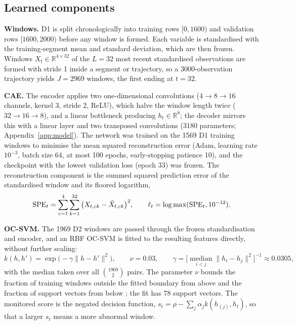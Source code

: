 \subsection{Learned components}

\textbf{Windows.} D1 is split chronologically into training rows $[0,1600)$ and validation rows
$[1600,2000)$ before any window is formed. Each variable is standardised with the training-segment
mean and standard deviation, which are then frozen. Windows $X_t\in\mathbb{R}^{4\times32}$ of the
$L=32$ most recent standardised observations are formed with stride 1 inside a segment or
trajectory, so a 3000-observation trajectory yields $J=2969$ windows, the first ending at $t=32$.

\textbf{CAE.} The encoder applies two one-dimensional convolutions ($4\to8\to16$ channels,
kernel 3, stride 2, ReLU), which halve the window length twice ($32\to16\to8$), and a linear
bottleneck producing $h_t\in\mathbb{R}^8$; the decoder mirrors this with a linear layer and two
transposed convolutions (3180 parameters; Appendix~\ref{app:model}). The network was trained on
the 1569 D1 training windows to minimise the mean squared reconstruction error (Adam, learning rate
$10^{-3}$, batch size 64, at most 100 epochs, early-stopping patience 10), and the checkpoint with
the lowest validation loss (epoch 33) was frozen. The reconstruction component is the summed
squared prediction error of the standardised window and its floored logarithm,
\begin{equation}
\mathrm{SPE}_t=\sum_{c=1}^{4}\sum_{k=1}^{32}\big(X_{t,ck}-\hat X_{t,ck}\big)^2,\qquad
\ell_t=\log\max(\mathrm{SPE}_t,10^{-12}).
\label{eq:spe}
\end{equation}

\textbf{OC-SVM.} The 1969 D2 windows are passed through the frozen standardisation and encoder, and
an RBF OC-SVM is fitted to the resulting features directly, without further scaling:
\begin{equation}
k(h,h')=\exp\!\big(-\gamma\lVert h-h'\rVert^2\big),\qquad \nu=0.03,\qquad
\gamma=\Big[\operatorname*{median}_{i<j}\lVert h_i-h_j\rVert^2\Big]^{-1}\approx0.0305,
\label{eq:ocsvm}
\end{equation}
with the median taken over all $\binom{1969}{2}$ pairs. The parameter $\nu$ bounds the fraction of
training windows outside the fitted boundary from above and the fraction of support vectors from
below \citep{scholkopf_estimating_2001}; the fit has 78 support vectors. The monitored score is the
negated decision function, $s_t=\rho-\sum_j\alpha_j k(h_{(j)},h_t)$, so that a larger $s_t$ means a
more abnormal window.


